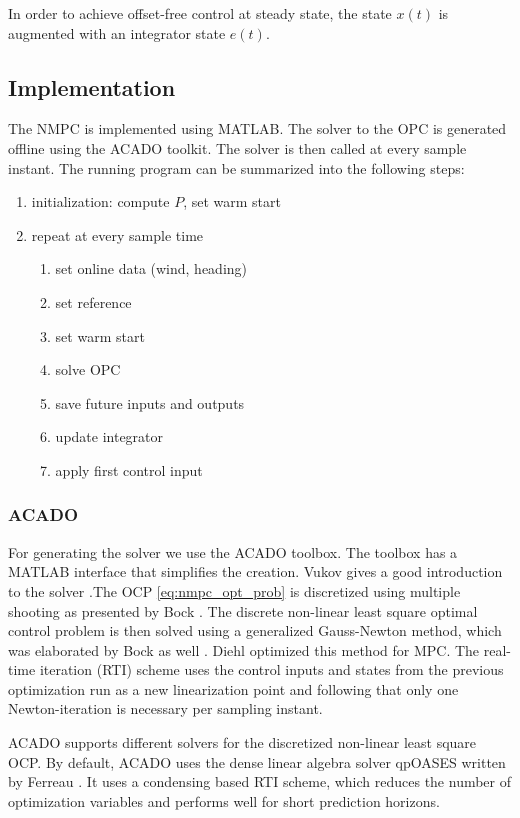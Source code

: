 In order to achieve offset-free control at steady state, the state $x(t)$ is augmented with an integrator state $e(t)$.
\subsection{Implementation}
The NMPC is implemented using MATLAB. The solver to the OPC is generated offline using the ACADO toolkit. The solver is then called at every sample instant. The running program can be summarized into the following steps:

\begin{enumerate}
\item initialization: compute $P$, set warm start
\item repeat at every sample time
\begin{enumerate}
\item set online data (wind, heading)
\item set reference
\item set warm start
\item solve OPC
\item save future inputs and outputs
\item update integrator
\item apply first control input
\end{enumerate}
\end{enumerate}
\subsubsection{ACADO}
For generating the solver we use the ACADO toolbox. The toolbox has a MATLAB interface that simplifies the creation. Vukov gives a good introduction to the solver \cite{Vukov2013}.The OCP \ref{eq:nmpc_opt_prob} is discretized using multiple shooting as presented by Bock \cite{bock1984multiple}. The discrete non-linear least square optimal control problem is then solved using a generalized Gauss-Newton method, which was elaborated by Bock as well \cite{Bock1983}. Diehl optimized this method for MPC. The real-time iteration (RTI) scheme \cite{Diehl2005} uses the control inputs and states from the previous optimization run as a new linearization point and following that only one Newton-iteration is necessary per sampling instant.

ACADO supports different solvers for the discretized non-linear least square OCP. By default, ACADO uses the dense linear algebra solver qpOASES written by Ferreau \cite{Ferreau2014}. It uses a condensing based RTI scheme, which reduces the number of optimization variables and performs well for short prediction horizons.

